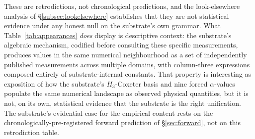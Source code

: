 \documentclass[11pt,a4paper]{amsart}
\theoremstyle{plain}
\theoremstyle{definition}
\begin{document}
These are retrodictions, not chronological predictions, and the look-elsewhere analysis of \S\ref{subsec:lookelsewhere} establishes that they are not statistical evidence under any honest null on the substrate's own grammar. What Table~\ref{tab:appearances} \emph{does} display is descriptive context: the substrate's algebraic mechanism, codified before consulting these specific measurements, produces values in the same numerical neighbourhood as a set of independently published measurements across multiple domains, with column-three expressions composed entirely of substrate-internal constants. That property is interesting as exposition of how the substrate's $H_3$-Coxeter basis and nine forced $\alpha$-values populate the same numerical landscape as observed physical quantities, but it is not, on its own, statistical evidence that the substrate is the right unification. The substrate's evidential case for the empirical content rests on the chronologically-pre-registered forward prediction of \S\ref{sec:forward}, not on this retrodiction table.
\end{document}
